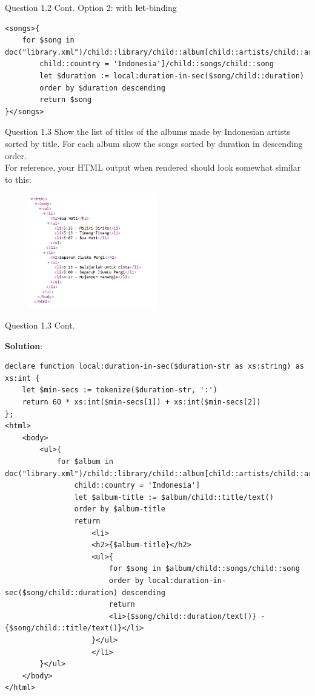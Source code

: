 \begin{frame}[fragile]{Question 1.2 Cont.}
Option 2: with \textbf{let}-binding\\\vspace{5pt}
\begin{lstlisting}[style=xml-small]
<songs>{
	for $song in doc("library.xml")/child::library/child::album[child::artists/child::artist/
		child::country = 'Indonesia']/child::songs/child::song
		let $duration := local:duration-in-sec($song/child::duration)
		order by $duration descending
		return $song
}</songs>
\end{lstlisting}

\end{frame}

\begin{frame}[fragile]{Question 1.3}
Show the list of titles of the albums made by Indonesian artists sorted by title. For each album show the songs sorted by duration in descending order.\\\vspace{5pt}
For reference, your HTML output when rendered should look somewhat similar to this: \\\vspace{-5pt}
\begin{figure}
	\includegraphics[width=0.5\textwidth,frame]{4221-t8/q3-output.png}
\end{figure}
\end{frame}

\begin{frame}[fragile]{Question 1.3 Cont.}

\textbf{Solution}: \\
\begin{lstlisting}[style=xml-small]
declare function local:duration-in-sec($duration-str as xs:string) as xs:int {
	let $min-secs := tokenize($duration-str, ':')
	return 60 * xs:int($min-secs[1]) + xs:int($min-secs[2])
};
<html>
	<body>
		<ul>{
			for $album in doc("library.xml")/child::library/child::album[child::artists/child::artist/
				child::country = 'Indonesia']
				let $album-title := $album/child::title/text()
				order by $album-title
				return
					<li>
					<h2>{$album-title}</h2>
					<ul>{
						for $song in $album/child::songs/child::song
						order by local:duration-in-sec($song/child::duration) descending
						return
						<li>{$song/child::duration/text()} - {$song/child::title/text()}</li>
					}</ul>
					</li>
		}</ul>
	</body>
</html>
\end{lstlisting}


\end{frame}


